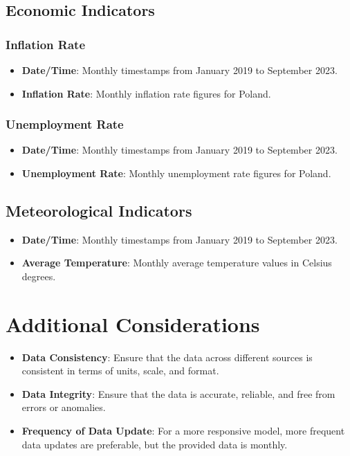 \documentclass{article}
\begin{document}
\subsection{Economic Indicators}

\subsubsection{Inflation Rate}
\begin{itemize}
    \item \textbf{Date/Time}: Monthly timestamps from January 2019 to September 2023.
    \item \textbf{Inflation Rate}: Monthly inflation rate figures for Poland.
\end{itemize}

\subsubsection{Unemployment Rate}
\begin{itemize}
    \item \textbf{Date/Time}: Monthly timestamps from January 2019 to September 2023.
    \item \textbf{Unemployment Rate}: Monthly unemployment rate figures for Poland.
\end{itemize}

\subsection{Meteorological Indicators}

\begin{itemize}
    \item \textbf{Date/Time}: Monthly timestamps from January 2019 to September 2023.
    \item \textbf{Average Temperature}: Monthly average temperature values in Celsius degrees.
\end{itemize}



\section{Additional Considerations}
\begin{itemize}
    \item \textbf{Data Consistency}: Ensure that the data across different sources is consistent in terms of units, scale, and format.
    \item \textbf{Data Integrity}: Ensure that the data is accurate, reliable, and free from errors or anomalies.
    \item \textbf{Frequency of Data Update}: For a more responsive model, more frequent data updates are preferable, but the provided data is monthly.
\end{itemize}
\end{document}
